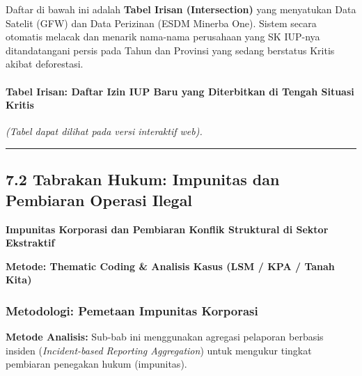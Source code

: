 \documentclass[
]{article}
\begin{document}
Daftar di bawah ini adalah \textbf{Tabel Irisan (Intersection)} yang
menyatukan Data Satelit (GFW) dan Data Perizinan (ESDM Minerba One).
Sistem secara otomatis melacak dan menarik nama-nama perusahaan yang SK
IUP-nya ditandatangani persis pada Tahun dan Provinsi yang sedang
berstatus Kritis akibat deforestasi.

\paragraph{Tabel Irisan: Daftar Izin IUP Baru yang Diterbitkan di Tengah
Situasi
Kritis}\label{tabel-irisan-daftar-izin-iup-baru-yang-diterbitkan-di-tengah-situasi-kritis}

\emph{(Tabel dapat dilihat pada versi interaktif web).}

\begin{center}\rule{0.5\linewidth}{0.5pt}\end{center}

\subsection{7.2 Tabrakan Hukum: Impunitas dan Pembiaran Operasi
Ilegal}\label{tabrakan-hukum-impunitas-dan-pembiaran-operasi-ilegal}

\textbf{Impunitas Korporasi dan Pembiaran Konflik Struktural di Sektor
Ekstraktif}

\textbf{Metode: Thematic Coding \& Analisis Kasus (LSM / KPA / Tanah
Kita)}

\subsubsection{Metodologi: Pemetaan Impunitas
Korporasi}\label{metodologi-pemetaan-impunitas-korporasi}

\textbf{Metode Analisis:} Sub-bab ini menggunakan agregasi pelaporan
berbasis insiden (\emph{Incident-based Reporting Aggregation}) untuk
mengukur tingkat pembiaran penegakan hukum (impunitas).
\end{document}
